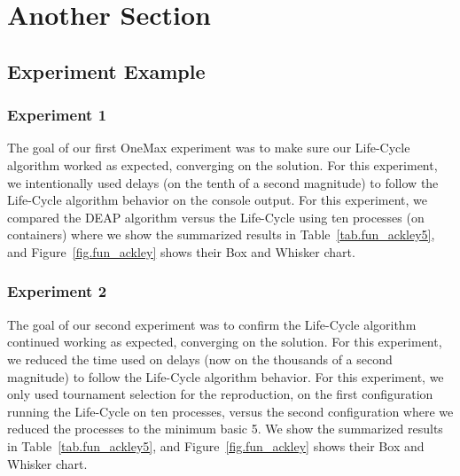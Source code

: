\documentclass[graybox]{svmult}
\begin{document}

\section{Another Section}
\label{section.another_section}

\subsection{Experiment Example}

\subsubsection{Experiment 1} The goal of our first OneMax experiment was to
make sure our Life-Cycle algorithm worked as expected, converging on the
solution. For this experiment, we intentionally used delays (on the tenth of a
second magnitude) to follow the Life-Cycle algorithm behavior on the console
output. For this experiment, we compared the DEAP algorithm versus the
Life-Cycle using ten processes (on containers) where we show the summarized
results in Table~\ref{tab.fun_ackley5}, and Figure~\ref{fig.fun_ackley} shows
their Box and Whisker chart.


\subsubsection{Experiment 2} The goal of our second experiment was to confirm
the Life-Cycle algorithm continued working as expected, converging on the
solution. For this experiment, we reduced the time used on delays (now on the
thousands of a second magnitude) to follow the Life-Cycle algorithm behavior.
For this experiment, we only used tournament selection for the reproduction, on
the first configuration running the Life-Cycle on ten processes, versus the
second configuration where we reduced the processes to the minimum basic 5. We
show the summarized results in Table~\ref{tab.fun_ackley5}, and
Figure~\ref{fig.fun_ackley} shows their Box and Whisker chart.
\end{document}
